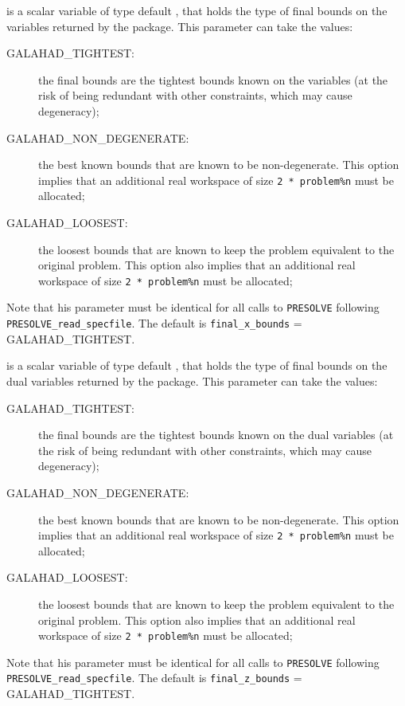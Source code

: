 \documentclass{galahad}
\newcommand{\packagename}{PRESOLVE}
\newcommand{\sym}{\sf\small}
\begin{document}
\begin{description}
 is a scalar variable of type default \integer, that
holds the type of final bounds on the variables returned by the
package.  This parameter can take the values:
\begin{description}
\item[\sym GALAHAD\_TIGHTEST:] the final bounds are the tightest bounds
                known on the variables (at the risk of
                being redundant with other constraints,
                which may cause degeneracy);
\item[\sym GALAHAD\_NON\_DEGENERATE:] the best known bounds that are known to
                      be non-degenerate. This option implies
                      that an additional real workspace of size
                      {\tt 2 * problem\%n} must be allocated;
\item[\sym GALAHAD\_LOOSEST:] the loosest bounds that are known to
               keep the problem equivalent to the
               original problem. This option also 
               implies that an additional real workspace of size 
               {\tt 2 * problem\%n} must be allocated;
\end{description}
Note that his parameter must be identical for all calls to 
{\tt \packagename} following {\tt \packagename\_read\_specfile}.
The default is {\tt final\_x\_bounds} = {\sym GALAHAD\_TIGHTEST}.

 is a scalar variable of type default \integer, that
holds the type of final bounds on the dual variables returned by 
the package.  This parameter can take the values:
\begin{description}
\item[\sym GALAHAD\_TIGHTEST:] the final bounds are the tightest bounds
                known on the dual variables (at the risk of
                being redundant with other constraints,
                which may cause degeneracy);
\item[\sym GALAHAD\_NON\_DEGENERATE:] the best known bounds that are known to
                      be non-degenerate. This option implies
                      that an additional real workspace of size
                      {\tt 2 * problem\%n} must be allocated;
\item[\sym GALAHAD\_LOOSEST:] the loosest bounds that are known to
               keep the problem equivalent to the
               original problem. This option also 
               implies that an additional real workspace of size
               {\tt 2 * problem\%n} must be allocated;
\end{description}
Note that his parameter must be identical for all calls to 
{\tt \packagename} following {\tt \packagename\_read\_specfile}.
The default is {\tt final\_z\_bounds} = {\sym GALAHAD\_TIGHTEST}.
         

\end{description}
\end{document}
